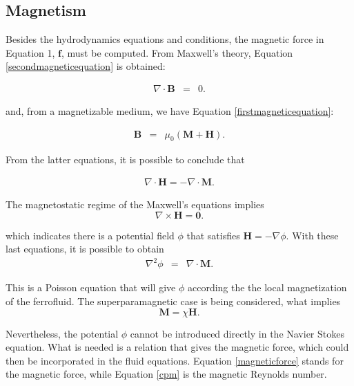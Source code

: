 \documentclass[journal]{IEEEtran}
\begin{document}
\subsection{Magnetism}
Besides the hydrodynamics equations and conditions, the magnetic force  in Equation 1, $\mathbf{f}$, must be computed. From Maxwell's theory, Equation \ref{secondmagneticequation} is obtained:

\begin{eqnarray}
\nabla\cdot \mathbf{B} & = & 0\label{secondmagneticequation}.
\end{eqnarray}

and, from a magnetizable medium, we have Equation \ref{firstmagneticequation}:

\begin{eqnarray}
\mathbf{B} &=& \mu_0(\mathbf{M}+\mathbf{H}).\label{firstmagneticequation}
\end{eqnarray}

From the latter equations, it is possible to conclude that 

\begin{eqnarray}
\nabla\cdot\mathbf{H} = -\nabla\cdot \mathbf{M}\label{mh1}.
\end{eqnarray}

The magnetostatic regime of the Maxwell's equations implies \begin{equation}\nabla\times \mathbf{H} = \mathbf{0}.
\end{equation} 

which indicates there is a potential field $\phi$ that satisfies $\mathbf{H} = -\nabla \phi$. With these last equations, it is possible to obtain \begin{eqnarray}
\nabla^2\phi &=& \nabla\cdot \mathbf{M}.\label{eqcampomag}
\end{eqnarray}

This is a Poisson equation that will give $\phi$ according the the local magnetization of the ferrofluid. The superparamagnetic case is being considered, what implies 
\begin{equation}\mathbf{M} = \chi \mathbf{H}.\end{equation}


Nevertheless, the potential $\phi$ cannot be introduced directly in the Navier Stokes equation. What is needed is a relation that gives the magnetic force, which could then be incorporated in the fluid equations. Equation \ref{magneticforce} stands for the magnetic force, while Equation \ref{cpm} is the magnetic Reynolds number.
\end{document}
